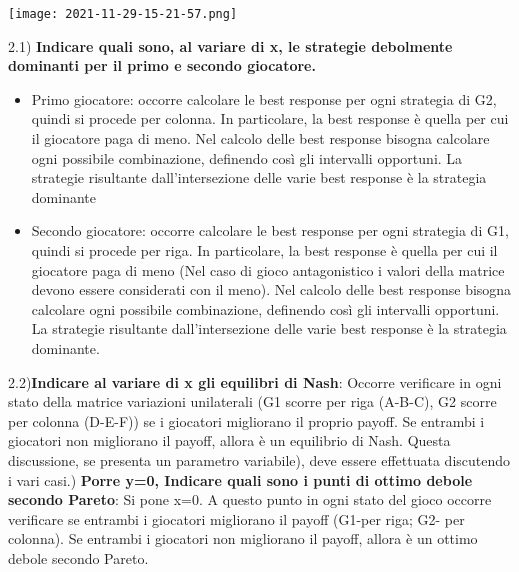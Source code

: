 \documentclass{article}
\theoremstyle{definition}
\theoremstyle{remark}
\begin{document}
\begin{center}
    \texttt{[image: 2021-11-29-15-21-57.png]}
\end{center}
2.1) \textbf{Indicare quali sono, al variare di x, le strategie debolmente dominanti per il primo e secondo giocatore.}\newline
\begin{itemize}
    \item Primo giocatore: occorre calcolare le best response per ogni strategia di G2, quindi si procede per colonna. In particolare, la best response è quella per cui il giocatore paga di meno.\newline
          Nel calcolo delle best response bisogna calcolare ogni possibile combinazione, definendo così gli intervalli opportuni. La strategie risultante dall'intersezione delle varie best response è la strategia dominante
    \item Secondo giocatore: occorre calcolare le best response per ogni strategia di G1, quindi si procede per riga. In particolare, la best response è quella per cui il giocatore paga di meno (Nel caso di gioco antagonistico i valori della matrice devono essere considerati con il meno).\newline
          Nel calcolo delle best response bisogna calcolare ogni possibile combinazione, definendo così gli intervalli opportuni. La strategie risultante dall'intersezione delle varie best response è la strategia dominante.
\end{itemize}
2.2)\textbf{Indicare al variare di x gli equilibri di Nash}: Occorre verificare in ogni stato della matrice variazioni unilaterali (G1 scorre per riga (A-B-C), G2 scorre per colonna (D-E-F)) se i giocatori migliorano il proprio payoff. Se entrambi i giocatori non migliorano il payoff, allora è un equilibrio di Nash.\newline
Questa discussione, se presenta un parametro variabile), deve essere effettuata discutendo i vari casi.) \textbf{Porre y=0, Indicare quali sono i punti di ottimo debole secondo Pareto}: Si pone x=0. A questo punto in ogni stato del gioco occorre verificare se entrambi i giocatori migliorano il payoff (G1-per riga; G2- per colonna). Se entrambi i giocatori non migliorano il payoff, allora è un ottimo debole secondo Pareto.\newline
\end{document}
